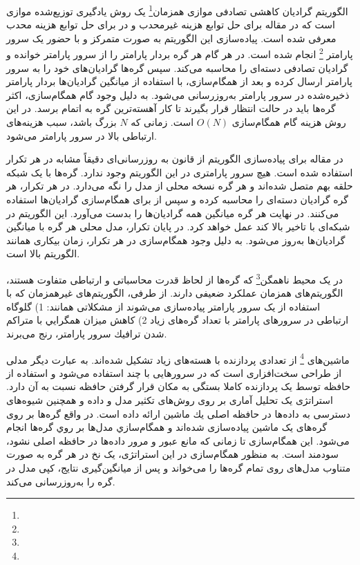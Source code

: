  الگوریتم گرادیان کاهشی تصادفی موازی همزمان\footnote{}   یک روش یادگیری توزیع‌شده موازی است که در مقاله \cite{Mini2016} برای حل توابع هزینه غیرمحدب و در \cite{dekel2012} برای حل توابع هزینه محدب معرفی شده است. پیاده‌سازی این الگوریتم به صورت متمرکز و با حضور یک سرور پارامتر  \footnote{} انجام شده است. در هر گام هر گره بردار پارامتر را از سرور پارامتر خوانده و گرادیان تصادفی دسته‌ای را محاسبه می‌کند. سپس گره‌ها گرادیان‌های خود را به سرور پارامتر ارسال کرده و بعد از همگام‌سازی، با استفاده از میانگین گرادیان‌ها بردار پارامتر ذخیره‌شده در سرور پارامتر به‌روزرسانی می‌شود. به دلیل وجود گام همگام‌سازی، اکثر گره‌ها باید در حالت انتظار قرار بگیرند تا کار آهسته‌ترین گره به اتمام برسد. در این روش هزینه گام‌ همگام‌سازی $O(N)$ است. زمانی که $N$ بزرگ باشد، سبب هزینه‌های ارتباطی بالا در سرور پارامتر می‌شود. 
 
 در مقاله \cite{nccl} برای پیاده‌سازی الگوریتم  از قانون به روزرسانی‌ای دقیقاً مشابه  در هر تکرار استفاده شده است. هیچ سرور پارامتری در این الگوریتم وجود ندارد. گره‌ها با یک شبکه حلقه بهم متصل شده‌اند و هر گره نسخه محلی از مدل را نگه می‌دارد. در هر تکرار، هر گره گرادیان دسته‌ای را محاسبه کرده و سپس از  برای همگام‌سازی گرادیان‌ها استفاده می‌کنند. در نهایت هر گره میانگین همه گرادیان‌ها را بدست می‌آورد. این الگوریتم در شبکه‌ای با تاخیر بالا کند عمل خواهد کرد. در پایان تکرار، مدل محلی هر گره با میانگین گرادیان‌ها به‌روز می‌شود. به دلیل وجود همگام‌سازی در هر تکرار، زمان بیکاری همانند الگوریتم  بالا است. 
 
در یک محیط ناهمگن\footnote{}  که گره‌ها از لحاظ قدرت محاسباتی و ارتباطی متفاوت هستند، الگوریتم‌های همزمان عملکرد ضعیفی دارند. از طرفی، الگوریتم‌های غیرهمزمان که با استفاده از یک سرور پارامتر پیاده‌سازی می‌شوند از مشکلاتی همانند: 1) گلوگاه ارتباطی در سرورهای پارامتر با تعداد گره‌های زياد 2) كاهش ميزان همگرايي با متراكم شدن ترافيك سرور پارامتر، رنج می‌برند. 
 
 ماشین‌های  \footnote{} از تعدادی پردازنده  با هسته‌های زیاد تشکیل شده‌اند. به عبارت دیگر مدلی از طراحی سخت‌افزاری است که در سرورهایی با چند  استفاده می‌شود و استفاده از حافظه توسط یک پردازنده  کاملا بستگی به مکان قرار گرفتن حافظه نسبت به آن دارد. استراتژی   \cite{DimmWitted} یک تحلیل آماری بر روی روش‌های تکثیر مدل و داده و همچنین شیوه‌های دسترسی به داده‌ها در حافظه اصلی يك ماشين  ارائه داده است. در واقع گره‌ها بر روی گره‌های یک ماشین  پیاده‌سازی شده‌اند و همگام‌سازي مدل‌ها بر روي گره‌ها انجام می‌شود. این همگام‌سازی تا زمانی‌ که مانع عبور و مرور داده‌ها در حافظه اصلی نشود، سودمند است. به منظور همگام‌سازی در این استراتژی، یک نخ در هر گره به صورت متناوب مدل‌های روی تمام گره‌ها را می‌خواند و پس از میانگین‌گیری نتایج، کپی مدل ‌در گره را به‌روزرسانی می‌‌کند.
 
